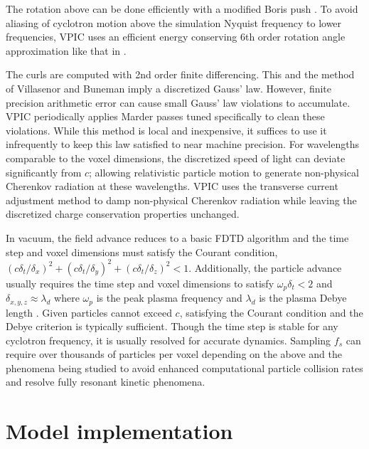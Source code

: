 \documentclass[letter,10pt]{article}
\begin{document}
The rotation above can be done efficiently with a modified Boris push
\cite{Boris_1970}.  To avoid aliasing of cyclotron motion above the
simulation Nyquist frequency to lower frequencies, VPIC uses an
efficient energy conserving 6th order rotation angle approximation
like that in \cite{Blahovec_et_al_2000}.

The curls are computed with 2nd order finite differencing.  This and
the method of Villasenor and Buneman imply a discretized Gauss' law.
However, finite precision arithmetic error can cause small Gauss' law
violations to accumulate.  VPIC periodically applies Marder passes
\cite{Marder_1987} tuned specifically to clean these violations.
While this method is local and inexpensive, it suffices to use it
infrequently to keep this law satisfied to near machine precision.
For wavelengths comparable to the voxel dimensions, the discretized
speed of light can deviate significantly from $c$; allowing
relativistic particle motion to generate non-physical Cherenkov
radiation at these wavelengths.  VPIC uses the transverse current
adjustment method \cite{Eastwood_et_al_1995} to damp non-physical
Cherenkov radiation while leaving the discretized charge conservation
properties unchanged.

In vacuum, the field advance reduces to a basic FDTD algorithm
\cite{Yee_1966} and the time step and voxel dimensions must satisfy the
Courant condition,
$\left(c\delta_t/\delta_x\right)^2 +
 \left(c\delta_t/\delta_y\right)^2 +
 \left(c\delta_t/\delta_z\right)^2 < 1$.
Additionally, the particle advance usually requires the time
step and voxel dimensions to satisfy $\omega_p \delta_t < 2$ and
$\delta_{x,y,z}
\approx \lambda_d$ where $\omega_p$ is the peak plasma frequency and
$\lambda_d$ is the plasma Debye length
\cite{Birdsall_Langdon_1985,Hockney_Eastwood_1988}.
Given particles cannot exceed $c$, satisfying the Courant condition
and the Debye criterion is typically sufficient.  Though the time step
is stable for any cyclotron frequency, it is usually resolved for
accurate dynamics.  Sampling $f_s$ can require over thousands of
particles per voxel depending on the above and the phenomena being
studied to avoid enhanced computational particle collision rates and
resolve fully resonant kinetic phenomena.

\section{Model implementation}
\end{document}
